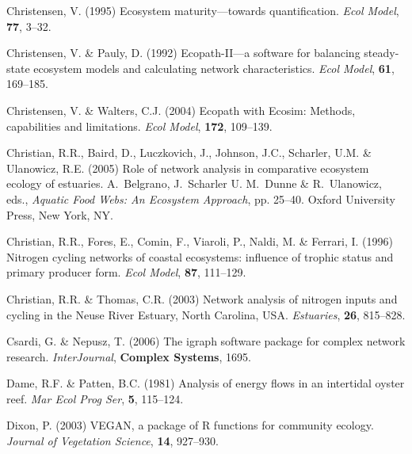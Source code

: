 \documentclass[11pt]{article}
\begin{document}
\begin{thebibliography}{79}
Christensen, V. (1995) Ecosystem maturity---towards quantification.
\newblock \emph{Ecol Model}, \textbf{77}, 3--32.

Christensen, V. \& Pauly, D. (1992) Ecopath-{II}---a software for balancing
  steady-state ecosystem models and calculating network characteristics.
\newblock \emph{Ecol Model}, \textbf{61}, 169--185.

Christensen, V. \& Walters, C.J. (2004) Ecopath with {E}cosim: {M}ethods,
  capabilities and limitations.
\newblock \emph{Ecol Model}, \textbf{172}, 109--139.

Christian, R.R., Baird, D., Luczkovich, J., Johnson, J.C., Scharler, U.M. \&
  Ulanowicz, R.E. (2005) Role of network analysis in comparative ecosystem
  ecology of estuaries.
\newblock A.~Belgrano, J.~Scharler U. M.~Dunne \& R.~Ulanowicz, eds.,
  \emph{Aquatic Food Webs: An Ecosystem Approach}, pp. 25--40. Oxford
  University Press, New York, NY.

Christian, R.R., Fores, E., Comin, F., Viaroli, P., Naldi, M. \& Ferrari, I.
  (1996) Nitrogen cycling networks of coastal ecosystems: influence of trophic
  status and primary producer form.
\newblock \emph{Ecol Model}, \textbf{87}, 111--129.

Christian, R.R. \& Thomas, C.R. (2003) Network analysis of nitrogen inputs and
  cycling in the {Neuse River Estuary, North Carolina, USA}.
\newblock \emph{Estuaries}, \textbf{26}, 815--828.

Csardi, G. \& Nepusz, T. (2006) The igraph software package for complex network
  research.
\newblock \emph{InterJournal}, \textbf{Complex Systems}, 1695.

Dame, R.F. \& Patten, B.C. (1981) Analysis of energy flows in an intertidal
  oyster reef.
\newblock \emph{Mar Ecol Prog Ser}, \textbf{5}, 115--124.

Dixon, P. (2003) {VEGAN}, a package of {R} functions for community ecology.
\newblock \emph{Journal of Vegetation Science}, \textbf{14}, 927--930.


\end{thebibliography}
\end{document}
